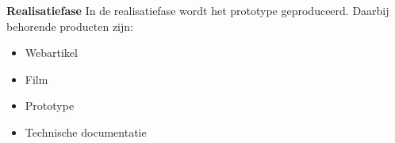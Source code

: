 \textbf{Realisatiefase} 
In de realisatiefase wordt het prototype geproduceerd. Daarbij behorende producten zijn:
\begin{itemize}
	\item Webartikel
	\item Film
	\item Prototype
	\item Technische documentatie
\end{itemize}
\newpage
